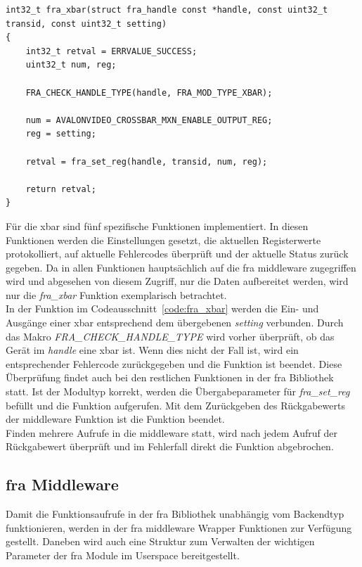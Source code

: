 \begin{lstfloat}
\begin{lstlisting}
int32_t fra_xbar(struct fra_handle const *handle, const uint32_t transid, const uint32_t setting)
{
	int32_t retval = ERRVALUE_SUCCESS;
	uint32_t num, reg;
	
	FRA_CHECK_HANDLE_TYPE(handle, FRA_MOD_TYPE_XBAR);
	
	num = AVALONVIDEO_CROSSBAR_MXN_ENABLE_OUTPUT_REG;
	reg = setting;
	
	retval = fra_set_reg(handle, transid, num, reg);  
	
	return retval;
}
\end{lstlisting}
\end{lstfloat}

Für die \ac{xbar} sind fünf spezifische Funktionen implementiert. In diesen Funktionen werden die Einstellungen gesetzt, die aktuellen Registerwerte protokolliert, auf aktuelle Fehlercodes überprüft und der aktuelle Status zurück gegeben. Da in allen Funktionen hauptsächlich auf die \ac{fra} \gls{middleware} zugegriffen wird und abgesehen von diesem Zugriff, nur die Daten aufbereitet werden, wird nur die \textit{fra\_xbar} Funktion exemplarisch betrachtet.\\

In der Funktion im Codeausschnitt~\ref{code:fra_xbar} werden die Ein- und Ausgänge einer \ac{xbar} entsprechend dem übergebenen \textit{setting} verbunden.
Durch das Makro \textit{FRA\_CHECK\_HANDLE\_TYPE} wird vorher überprüft, ob das Gerät im \textit{handle} eine \ac{xbar} ist. Wenn dies nicht der Fall ist, wird ein entsprechender Fehlercode zurückgegeben und die Funktion ist beendet. Diese Überprüfung findet auch bei den restlichen Funktionen in der \ac{fra} Bibliothek statt.
Ist der Modultyp korrekt, werden die Übergabeparameter für \textit{fra\_set\_reg} befüllt und die Funktion aufgerufen. Mit dem Zurückgeben des Rückgabewerts der \gls{middleware} Funktion ist die Funktion beendet.\\

Finden mehrere Aufrufe in die \gls{middleware} statt, wird nach jedem Aufruf der Rückgabewert überprüft und im Fehlerfall direkt die Funktion abgebrochen.


\subsection{\acs{fra} Middleware}\label{sec:middleware}
Damit die Funktionsaufrufe in der \ac{fra} Bibliothek unabhängig vom Backendtyp funktionieren, werden in der \ac{fra} \gls{middleware} Wrapper Funktionen zur Verfügung gestellt. Daneben wird auch eine Struktur zum Verwalten der wichtigen Parameter der \ac{fra} Module im Userspace bereitgestellt.


